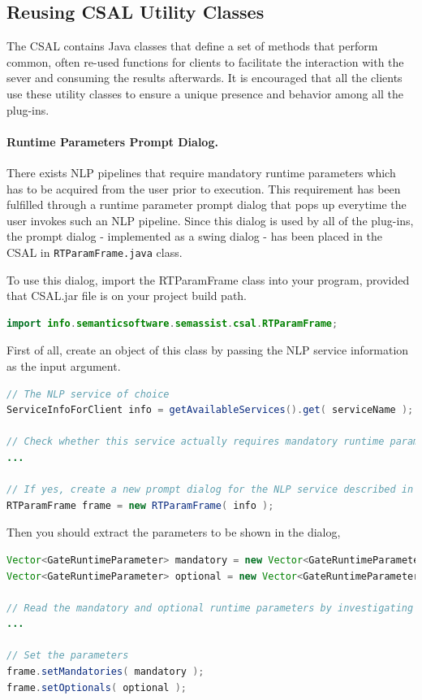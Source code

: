 \subsection{Reusing CSAL Utility Classes}
The CSAL contains Java classes that define a set of methods that perform common, often re-used functions for clients to facilitate the interaction with the sever and consuming the results afterwards. It is encouraged that all the clients use these utility classes to ensure a unique presence and behavior among all the plug-ins.

\paragraph{Runtime Parameters Prompt Dialog.} There exists NLP pipelines that require mandatory runtime parameters which has to be acquired from the user prior to execution. This requirement has been fulfilled through a runtime parameter prompt dialog that pops up everytime the user invokes such an NLP pipeline. Since this dialog is used by all of the plug-ins, the prompt dialog - implemented as a swing dialog - has been placed in the CSAL in \texttt{RTParamFrame.java} class.

To use this dialog, import the RTParamFrame class into your program, provided that CSAL.jar file is on your project build path.

\begin{lstlisting}[language=Java,xleftmargin=4mm,columns=flexible]
import info.semanticsoftware.semassist.csal.RTParamFrame;
\end{lstlisting}

First of all, create an object of this class by passing the NLP service information as the input argument.  

\begin{lstlisting}[language=Java,xleftmargin=4mm,columns=flexible]
// The NLP service of choice
ServiceInfoForClient info = getAvailableServices().get( serviceName );

// Check whether this service actually requires mandatory runtime parameters
...

// If yes, create a new prompt dialog for the NLP service described in the 'info' argument
RTParamFrame frame = new RTParamFrame( info );   
\end{lstlisting}

Then you should extract the parameters to be shown in the dialog,
\begin{lstlisting}[language=Java,xleftmargin=4mm,columns=flexible]
Vector<GateRuntimeParameter> mandatory = new Vector<GateRuntimeParameter>();
Vector<GateRuntimeParameter> optional = new Vector<GateRuntimeParameter>();

// Read the mandatory and optional runtime parameters by investigating the 'info' parameters list
...

// Set the parameters
frame.setMandatories( mandatory );
frame.setOptionals( optional );
\end{lstlisting}

